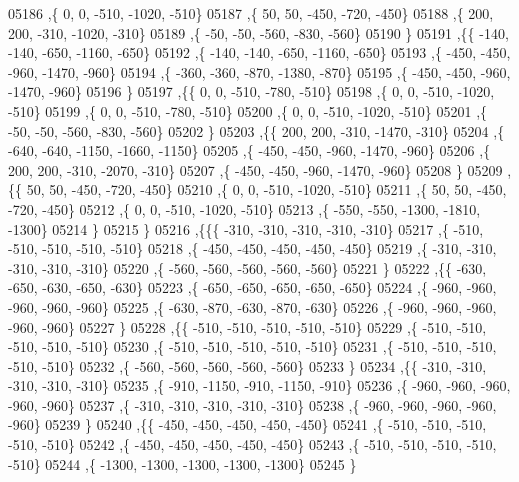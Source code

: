 \begin{DoxyCode}
05186     ,\{     0,     0,  -510, -1020,  -510\}
05187     ,\{    50,    50,  -450,  -720,  -450\}
05188     ,\{   200,   200,  -310, -1020,  -310\}
05189     ,\{   -50,   -50,  -560,  -830,  -560\}
05190     \}
05191    ,\{\{  -140,  -140,  -650, -1160,  -650\}
05192     ,\{  -140,  -140,  -650, -1160,  -650\}
05193     ,\{  -450,  -450,  -960, -1470,  -960\}
05194     ,\{  -360,  -360,  -870, -1380,  -870\}
05195     ,\{  -450,  -450,  -960, -1470,  -960\}
05196     \}
05197    ,\{\{     0,     0,  -510,  -780,  -510\}
05198     ,\{     0,     0,  -510, -1020,  -510\}
05199     ,\{     0,     0,  -510,  -780,  -510\}
05200     ,\{     0,     0,  -510, -1020,  -510\}
05201     ,\{   -50,   -50,  -560,  -830,  -560\}
05202     \}
05203    ,\{\{   200,   200,  -310, -1470,  -310\}
05204     ,\{  -640,  -640, -1150, -1660, -1150\}
05205     ,\{  -450,  -450,  -960, -1470,  -960\}
05206     ,\{   200,   200,  -310, -2070,  -310\}
05207     ,\{  -450,  -450,  -960, -1470,  -960\}
05208     \}
05209    ,\{\{    50,    50,  -450,  -720,  -450\}
05210     ,\{     0,     0,  -510, -1020,  -510\}
05211     ,\{    50,    50,  -450,  -720,  -450\}
05212     ,\{     0,     0,  -510, -1020,  -510\}
05213     ,\{  -550,  -550, -1300, -1810, -1300\}
05214     \}
05215    \}
05216   ,\{\{\{  -310,  -310,  -310,  -310,  -310\}
05217     ,\{  -510,  -510,  -510,  -510,  -510\}
05218     ,\{  -450,  -450,  -450,  -450,  -450\}
05219     ,\{  -310,  -310,  -310,  -310,  -310\}
05220     ,\{  -560,  -560,  -560,  -560,  -560\}
05221     \}
05222    ,\{\{  -630,  -650,  -630,  -650,  -630\}
05223     ,\{  -650,  -650,  -650,  -650,  -650\}
05224     ,\{  -960,  -960,  -960,  -960,  -960\}
05225     ,\{  -630,  -870,  -630,  -870,  -630\}
05226     ,\{  -960,  -960,  -960,  -960,  -960\}
05227     \}
05228    ,\{\{  -510,  -510,  -510,  -510,  -510\}
05229     ,\{  -510,  -510,  -510,  -510,  -510\}
05230     ,\{  -510,  -510,  -510,  -510,  -510\}
05231     ,\{  -510,  -510,  -510,  -510,  -510\}
05232     ,\{  -560,  -560,  -560,  -560,  -560\}
05233     \}
05234    ,\{\{  -310,  -310,  -310,  -310,  -310\}
05235     ,\{  -910, -1150,  -910, -1150,  -910\}
05236     ,\{  -960,  -960,  -960,  -960,  -960\}
05237     ,\{  -310,  -310,  -310,  -310,  -310\}
05238     ,\{  -960,  -960,  -960,  -960,  -960\}
05239     \}
05240    ,\{\{  -450,  -450,  -450,  -450,  -450\}
05241     ,\{  -510,  -510,  -510,  -510,  -510\}
05242     ,\{  -450,  -450,  -450,  -450,  -450\}
05243     ,\{  -510,  -510,  -510,  -510,  -510\}
05244     ,\{ -1300, -1300, -1300, -1300, -1300\}
05245     \}

\end{DoxyCode}
